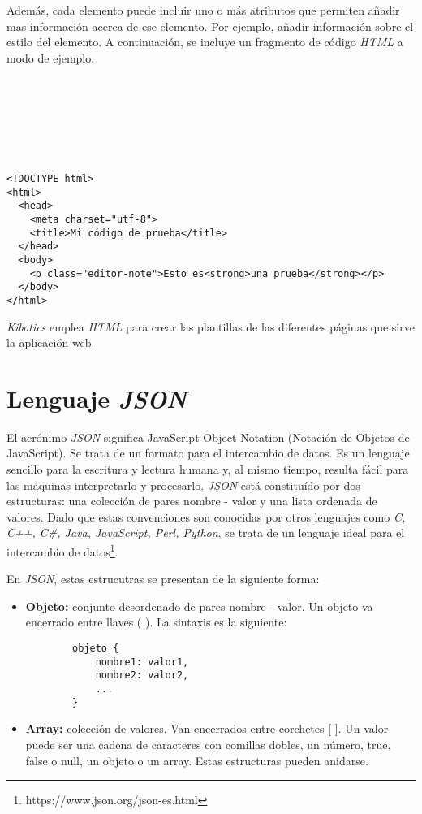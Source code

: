    


Además, cada elemento puede incluir uno o más atributos que permiten añadir mas información acerca de ese elemento. Por ejemplo, añadir información sobre el estilo del elemento. A continuación, se incluye un fragmento de código \textit{HTML} a modo de ejemplo. 
\begin{verbatim}







<!DOCTYPE html>
<html>
  <head>
    <meta charset="utf-8">
    <title>Mi código de prueba</title>
  </head>
  <body>
    <p class="editor-note">Esto es<strong>una prueba</strong></p>
  </body>
</html>
\end{verbatim}

\textit{Kibotics} emplea \textit{HTML} para crear las plantillas de las diferentes páginas que sirve la aplicación web.

\section{Lenguaje \textit{JSON}}
El acrónimo \textit{JSON} significa JavaScript Object Notation (Notación de Objetos de JavaScript). Se trata de un formato para el intercambio de datos. Es un lenguaje sencillo para la escritura y lectura humana y, al mismo tiempo, resulta fácil para las máquinas interpretarlo y procesarlo. \textit{JSON} está constituído por dos estructuras: una colección de pares nombre - valor y una lista ordenada de valores. Dado que estas convenciones son conocidas por otros lenguajes como  \textit{C, C++, C#, Java, JavaScript, Perl, Python}, se trata de un lenguaje ideal para el intercambio de datos\footnote{https://www.json.org/json-es.html}. \newline

\clearpage
En \textit{JSON}, estas estrucutras se presentan de la siguiente forma:
\begin{itemize}
    \item \textbf{Objeto: } conjunto desordenado de pares nombre - valor. Un objeto va encerrado entre llaves ({ }). La sintaxis es la siguiente: 
    \begin{verbatim}
        objeto {
            nombre1: valor1,
            nombre2: valor2,
            ...
        }
    \end{verbatim}
    \item \textbf{Array: } colección de valores. Van encerrados entre corchetes [ ]. Un valor puede ser una cadena de caracteres con comillas dobles, un número, true, false o null, un objeto o un array. Estas estructuras pueden anidarse.

\end{itemize}

